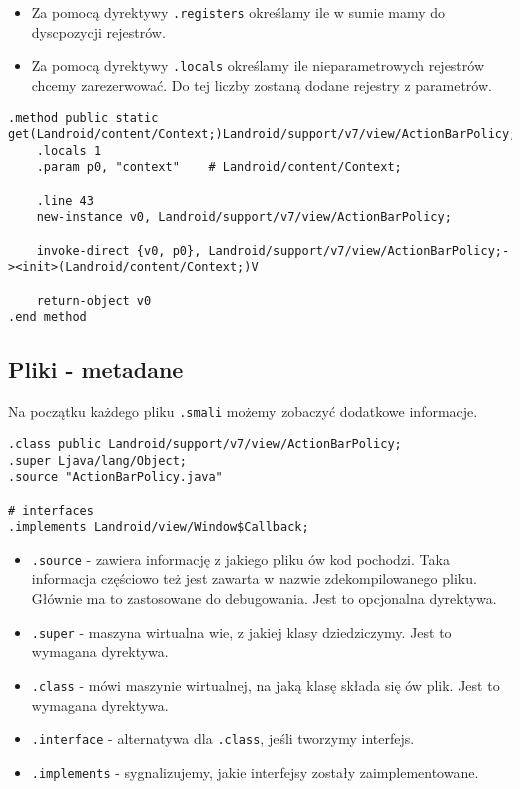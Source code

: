 \documentclass[12pt,a4paper,leqno,oneside,titlepage]{book}
\begin{document}
\begin{itemize}
\item Za pomocą dyrektywy \verb|.registers| określamy ile w sumie mamy do dyscpozycji rejestrów.
\item Za pomocą dyrektywy \verb|.locals| określamy ile nieparametrowych rejestrów chcemy zarezerwować. Do tej liczby zostaną dodane rejestry z parametrów.
\end{itemize}
%
\begin{lstlisting}[language=smali,captionpos=b,caption={Smali}]
.method public static get(Landroid/content/Context;)Landroid/support/v7/view/ActionBarPolicy;
    .locals 1
    .param p0, "context"    # Landroid/content/Context;

    .line 43
    new-instance v0, Landroid/support/v7/view/ActionBarPolicy;

    invoke-direct {v0, p0}, Landroid/support/v7/view/ActionBarPolicy;-><init>(Landroid/content/Context;)V

    return-object v0
.end method
\end{lstlisting}
%
\subsection{Pliki - metadane}
%
Na początku każdego pliku \verb|.smali| możemy zobaczyć dodatkowe informacje.
%
\begin{lstlisting}[language=smali,captionpos=b,caption={Smali}]
.class public Landroid/support/v7/view/ActionBarPolicy;
.super Ljava/lang/Object;
.source "ActionBarPolicy.java"

# interfaces
.implements Landroid/view/Window$Callback;
\end{lstlisting}
%
\begin{itemize}
\item \verb|.source| - zawiera informację z jakiego pliku ów kod pochodzi. Taka informacja częściowo też jest zawarta w nazwie zdekompilowanego pliku. Głównie ma to zastosowane do debugowania. Jest to opcjonalna dyrektywa.
\item \verb|.super| - maszyna wirtualna wie, z jakiej klasy dziedziczymy. Jest to wymagana dyrektywa.
\item \verb|.class| - mówi maszynie wirtualnej, na jaką klasę składa się ów plik. Jest to wymagana dyrektywa.
\item \verb|.interface| - alternatywa dla \verb|.class|, jeśli tworzymy interfejs.
\item \verb|.implements| - sygnalizujemy, jakie interfejsy zostały zaimplementowane.
\end{itemize}
\end{document}
